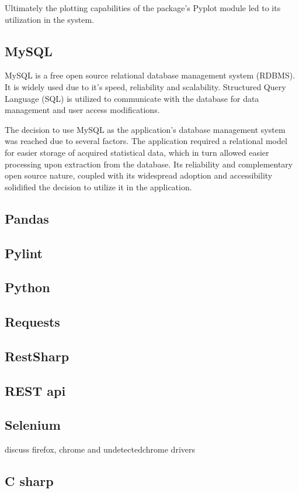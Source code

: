 \documentclass{thesis-ekf}
\theoremstyle{definition}
\theoremstyle{remark}
\begin{document}
{Ultimately the plotting capabilities of the package's Pyplot module led to its utilization in the system.

\subsection{MySQL}
MySQL is a free open source relational database management system (RDBMS). It is widely used due to it's speed, reliability and scalability. Structured Query Language (SQL) is utilized to communicate with the database for data management and user access modifications. \cite{wiki-mysql}

The decision to use MySQL as the application's database management system was reached due to several factors. The application required a relational model for easier storage of acquired statistical data, which in turn allowed easier processing upon extraction from the database. Its reliability and complementary open source nature, coupled with its widespread adoption and accessibility solidified the decision to utilize it in the application.

\subsection{Pandas}
\subsection{Pylint}
\subsection{Python} \label{sub-python}
\subsection{Requests}
\subsection{RestSharp}
\subsection{REST api}
\subsection{Selenium}
discuss firefox, chrome and undetectedchrome drivers

\subsection{C sharp}
}
\end{document}

